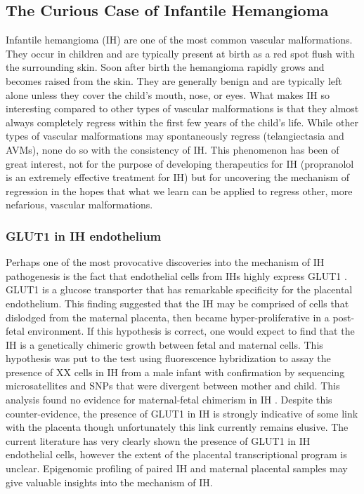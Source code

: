 \subsection{The Curious Case of Infantile Hemangioma}
Infantile hemangioma (IH) are one of the most common vascular malformations. They occur in children and are typically present at birth as a red spot flush with the surrounding skin. Soon after birth the hemangioma rapidly grows and becomes raised from the skin. They are generally benign and are typically left alone unless they cover the child's mouth, nose, or eyes. What makes IH so interesting compared to other types of vascular malformations is that they almost always completely regress within the first few years of the child's life. While other types of vascular malformations may spontaneously regress (telangiectasia and AVMs), none do so with the consistency of IH. This phenomenon has been of great interest, not for the purpose of developing therapeutics for IH (propranolol is an extremely effective treatment for IH) but for uncovering the mechanism of regression in the hopes that what we learn can be applied to regress other, more nefarious, vascular malformations. 

\subsubsection{GLUT1 in IH endothelium}
Perhaps one of the most provocative discoveries into the mechanism of IH pathogenesis is the fact that endothelial cells from IHs highly express GLUT1 \citep{north2000, north2001}. GLUT1 is a glucose transporter that has remarkable specificity for the placental endothelium. This finding suggested that the IH may be comprised of cells that dislodged from the maternal placenta, then became hyper-proliferative in a post-fetal environment. If this hypothesis is correct, one would expect to find that the IH is a genetically chimeric growth between fetal and maternal cells. This hypothesis was put to the test using fluorescence  hybridization to assay the presence of XX cells in IH from a male infant with confirmation by sequencing microsatellites and SNPs that were divergent between mother and child. This analysis found no evidence for maternal-fetal chimerism in IH \citep{pittman2006}. Despite this counter-evidence, the presence of GLUT1 in IH is strongly indicative of some link with the placenta though unfortunately this link currently remains elusive. The current literature has very clearly shown the presence of GLUT1 in IH endothelial cells, however the extent of the placental transcriptional program is unclear. Epigenomic profiling of paired IH and maternal placental samples may give valuable insights into the mechanism of IH. 


